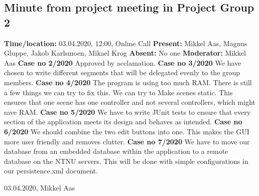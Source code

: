 \documentclass{article}
\begin{document}
\subsection{Minute from project meeting in Project Group 2}
\newline
\textbf{Time/location:} 03.04.2020, 12:00, Online Call
\newline
\textbf{Present: }Mikkel Aas, Magnus Gluppe, Jakob Karlsmoen, Mikael Krog
\newline
\textbf{Absent:} No one
\newline
\textbf{Moderator:} Mikkel Aas
\newline \newline
\textbf{Case no 2/2020} \newline
Approved by acclamation.
\newline  \newline
\textbf{Case no 3/2020}  \newline
We have chosen to write different segments that will be delegated evenly to the group members. 
\newline  \newline
\textbf{Case no 4/2020}  \newline
The program is using too much RAM. There is still a few things we can try to fix this. We can try to Make scenes static. This ensures that one scene has one controller and not several controllers, which might save RAM.
\newline  \newline
\textbf{Case no 5/2020}  \newline
We have to write JUnit tests to ensure that every section of the application meets its design and behaves as intended.
\newline  \newline
\textbf{Case no 6/2020}  \newline
We should combine the two edit buttons into one. This makes the GUI more user friendly and removes clutter.
\newline  \newline
\textbf{Case no 7/2020}  \newline
We have to move our database from an embedded database within the application to a remote database on the NTNU servers. This will be done with simple configurations in our persistence.xml document.
\begin{flushright} 03.04.2020, Mikkel Aas\end{flushright}

\newpage
\end{document}
